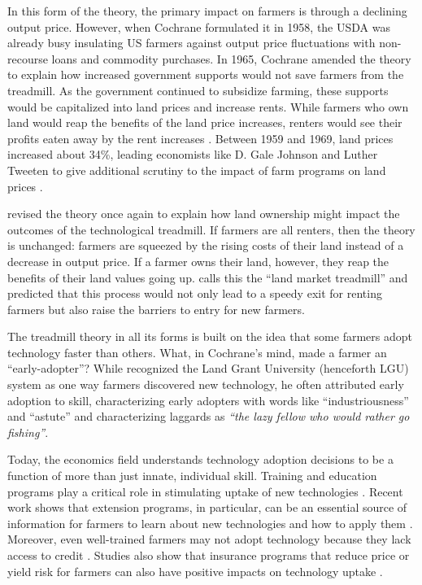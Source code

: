 \documentclass[12pt]{article}
\begin{document}
In this form of the theory, the primary impact on farmers is through a declining output price.
However, when Cochrane formulated it in 1958, the USDA was already busy insulating US farmers against output price fluctuations with non-recourse loans and commodity purchases. 
In 1965, Cochrane amended the theory to explain how increased government supports would not save farmers from the treadmill.
As the government continued to subsidize farming, these supports would be capitalized into land prices and increase rents. 
While farmers who own land would reap the benefits of the land price increases, renters would see their profits eaten away by the rent increases \citep{cochrane_city_1965}. 
Between 1959 and 1969, land prices increased about 34\%, leading economists like D. Gale Johnson and Luther Tweeten to give additional scrutiny to the impact of farm programs on land prices \citep{johnson_farm_1973,tweeten_foundations_1970}. 

\citet{cochrane_development_1993} revised the theory once again to explain how land ownership might impact the outcomes of the technological treadmill.
If farmers are all renters, then the theory is unchanged: farmers are squeezed by the rising costs of their land instead of a decrease in output price. 
If a farmer owns their land, however, they reap the benefits of their land values going up. 
\citet{levins_treadmill_1996} calls this the ``land market treadmill'' and predicted that this process would not only lead to a speedy exit for renting farmers but also raise the barriers to entry for new farmers.

The treadmill theory in all its forms is built on the idea that some farmers adopt technology faster than others.
What, in Cochrane's mind, made a farmer an ``early-adopter''?
While \citet{cochrane_city_1965} recognized the Land Grant University (henceforth LGU) system as one way farmers discovered new technology, he often attributed early adoption to skill, characterizing early adopters with words like “industriousness” and “astute” and characterizing laggards as \textit{``the lazy fellow who would rather go fishing''}\citep{cochrane_farm_1958,cochrane_city_1965}. 

Today, the economics field understands technology adoption decisions to be a function of more than just innate, individual skill.
Training and education programs play a critical role in stimulating uptake of new technologies \citep{pan_agricultural_2018,takahashi_technology_2020}.
Recent work shows that extension programs, in particular, can be an essential source of information for farmers to learn about new technologies and how to apply them \citep{deutschmann_can_2019,kondylis_seeing_2017}.
Moreover, even well-trained farmers may not adopt technology because they lack access to credit \citep{karlan_agricultural_2014,regassa_access_2023}.
Studies also show that insurance programs that reduce price or yield risk for farmers can also have positive impacts on technology uptake \citep{karlan_crop_2011,arouna_contract_2021,carter_where_2016}.
\end{document}

